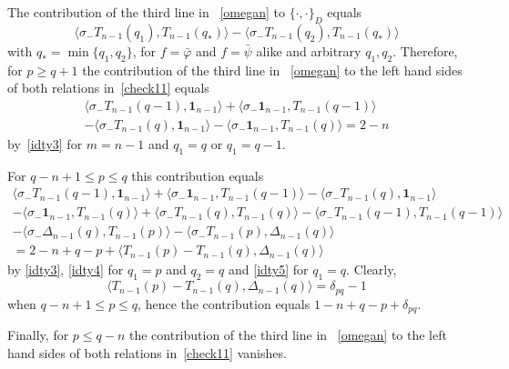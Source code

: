 \documentclass{amsart}
\theoremstyle{definition}
\theoremstyle{remark}
\numberwithin{equation}{section}
\numberwithin{theorem}{section}
\begin{document}
The contribution of the third line in ~\eqref{omegan} to ${{\{\cdot,\cdot\}}}_D$ equals
$$
\langle\sigma_-T_{n-1}(q_1),T_{n-1}(q_*)\rangle -\langle\sigma_-T_{n-1}(q_2),T_{n-1}(q_*)\rangle
$$
with $q_*=\min\{q_1,q_2\}$, for $f=\bar{{\varphi}}$ and $f=\bar{{\psi}}$ alike and arbitrary $q_1, q_2$.
Therefore, for $p\ge q+1$ the  contribution of the third line in ~\eqref{omegan} to the left hand 
sides of  both relations in~\eqref{check11} equals
\begin{equation*}
\begin{split} 
\langle \sigma_-T_{n-1}(q-1),{\mathbf 1}_{n-1}\rangle +\langle \sigma_-{\mathbf 1}_{n-1},T_{n-1}(q-1)\rangle\\
-\langle \sigma_-T_{n-1}(q),{\mathbf 1}_{n-1}\rangle -\langle \sigma_-{\mathbf 1}_{n-1},T_{n-1}(q)\rangle=2-n
\end{split}
\end{equation*}
by~\eqref{idty3} for $m=n-1$ and $q_1=q$ or $q_1=q-1$. 

For $q-n+1\le p\le q$ this contribution equals
\begin{equation*}
\begin{split} 
\langle \sigma_-T_{n-1}(q-1),{\mathbf 1}_{n-1}\rangle +\langle \sigma_-{\mathbf 1}_{n-1},T_{n-1}(q-1)\rangle
-\langle \sigma_-T_{n-1}(q),{\mathbf 1}_{n-1}\rangle \\-\langle \sigma_-{\mathbf 1}_{n-1},T_{n-1}(q)\rangle
+\langle\sigma_-T_{n-1}(q), T_{n-1}(q)\rangle -\langle\sigma_- T_{n-1}(q-1), T_{n-1}(q-1)\rangle\\
-\langle\sigma_-\Delta_{n-1}(q), T_{n-1}(p)\rangle-\langle\sigma_-T_{n-1}(p),
\Delta_{n-1}(q)\rangle\\
=2-n+q-p+\langle  T_{n-1}(p)-T_{n-1}(q), \Delta_{n-1}(q)\rangle
\end{split}
\end{equation*}
by \eqref{idty3}, \eqref{idty4} for $q_1=p$ and $q_2=q$ and \eqref{idty5} for $q_1=q$. 
Clearly,
$$
\langle T_{n-1}(p)-T_{n-1}(q), \Delta_{n-1}(q)\rangle=\delta_{pq}-1
$$ 
when $q-n+1\le p\le q$, hence the contribution equals $1-n+q-p+\delta_{pq}$.

Finally, for $p\le q-n$ the  contribution of the third line in ~\eqref{omegan} to the left hand 
sides of  both relations in~\eqref{check11} vanishes.
\end{document}
